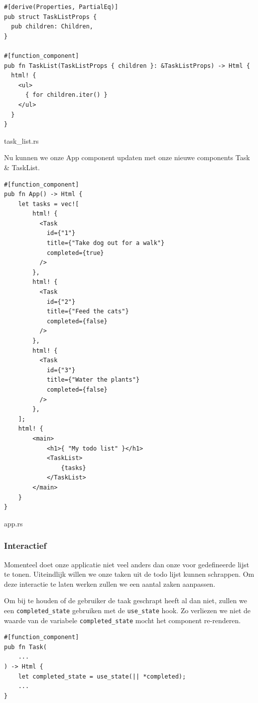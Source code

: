 \begin{listing}[h]
\begin{verbatim}
#[derive(Properties, PartialEq)]
pub struct TaskListProps {
  pub children: Children,
}

#[function_component]
pub fn TaskList(TaskListProps { children }: &TaskListProps) -> Html {
  html! {
    <ul>
      { for children.iter() }
    </ul>
  }
}
\end{verbatim}
\caption{task\_list.rs}
\end{listing}

Nu kunnen we onze App component updaten met onze nieuwe components Task \& TaskList.

\begin{listing}[h]
\begin{verbatim}
#[function_component]
pub fn App() -> Html {
    let tasks = vec![
        html! { 
          <Task 
            id={"1"}
            title={"Take dog out for a walk"}
            completed={true}
          /> 
        },
        html! { 
          <Task 
            id={"2"}
            title={"Feed the cats"}
            completed={false}
          /> 
        },
        html! { 
          <Task 
            id={"3"}
            title={"Water the plants"}
            completed={false}
          /> 
        },
    ];
    html! {
        <main>
            <h1>{ "My todo list" }</h1>
            <TaskList>
                {tasks}
            </TaskList>
        </main>
    }
}
\end{verbatim}
\caption{app.rs}
\end{listing}

\clearpage

\subsubsection{Interactief}
Momenteel doet onze applicatie niet veel anders dan onze voor gedefineerde lijst te tonen.
Uiteindlijk willen we onze taken uit de todo lijst kunnen schrappen. Om deze interactie te laten
werken zullen we een aantal zaken aanpassen.

Om bij te houden of de gebruiker de taak geschrapt heeft al dan niet, zullen we een
\texttt{completed_state} gebruiken met de \texttt{use_state} hook. Zo verliezen
we niet de waarde van de variabele \texttt{completed_state} mocht het component
re-renderen.

\begin{verbatim}
#[function_component]
pub fn Task(
    ...
) -> Html {
    let completed_state = use_state(|| *completed);
    ...
}
\end{verbatim}

